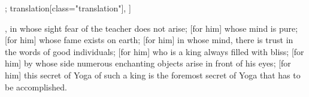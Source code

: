 \begin{alignment}[
  texts=edition[class="edition"];
  translation[class="translation"],
  ]
\begin{translation}
\begin{tlate}
, in whose sight fear of the teacher does not arise; [for him] whose mind is pure; [for him] whose fame exists on earth; [for him] in whose mind, there is trust in the words of good individuals; [for him] who is a king always filled with bliss; [for him] by whose side numerous enchanting objects arise in front of his eyes; [for him] this secret of Yoga of such a king is the foremost secret of Yoga that has to be accomplished.
    \end{tlate}
  \end{translation}
\end{alignment}
\pagebreak %
